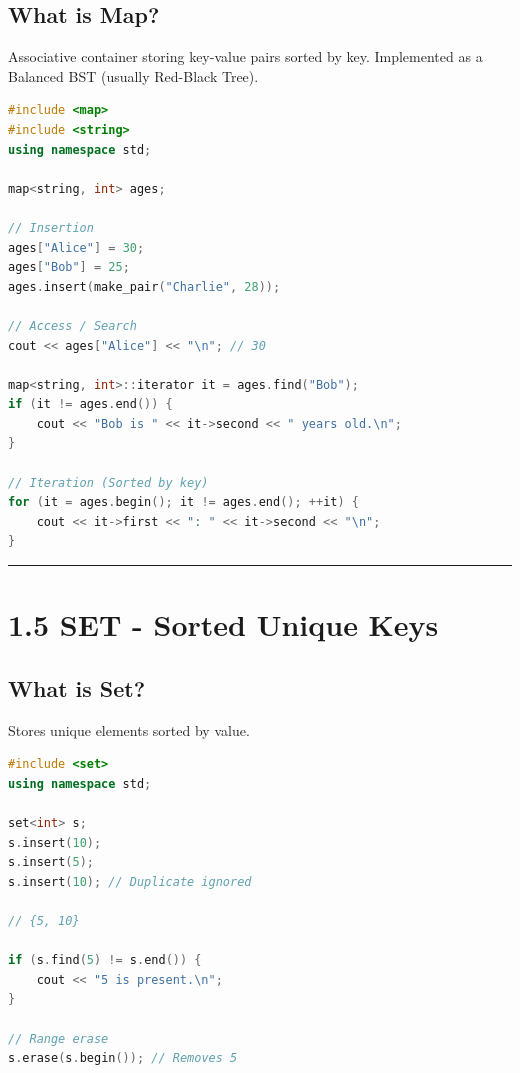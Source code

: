 \hypertarget{what-is-map}{%
\subsection{What is Map?}\label{what-is-map}}

Associative container storing key-value pairs sorted by key. Implemented
as a Balanced BST (usually Red-Black Tree).

\begin{lstlisting}[language={C++}]
#include <map>
#include <string>
using namespace std;

map<string, int> ages;

// Insertion
ages["Alice"] = 30;
ages["Bob"] = 25;
ages.insert(make_pair("Charlie", 28));

// Access / Search
cout << ages["Alice"] << "\n"; // 30

map<string, int>::iterator it = ages.find("Bob");
if (it != ages.end()) {
    cout << "Bob is " << it->second << " years old.\n";
}

// Iteration (Sorted by key)
for (it = ages.begin(); it != ages.end(); ++it) {
    cout << it->first << ": " << it->second << "\n";
}
\end{lstlisting}

\begin{center}\rule{0.5\linewidth}{0.5pt}\end{center}

\hypertarget{set---sorted-unique-keys}{%
\section{1.5 SET - Sorted Unique Keys}\label{set---sorted-unique-keys}}

\hypertarget{what-is-set}{%
\subsection{What is Set?}\label{what-is-set}}

Stores unique elements sorted by value.

\begin{lstlisting}[language={C++}]
#include <set>
using namespace std;

set<int> s;
s.insert(10);
s.insert(5);
s.insert(10); // Duplicate ignored

// {5, 10}

if (s.find(5) != s.end()) {
    cout << "5 is present.\n";
}

// Range erase
s.erase(s.begin()); // Removes 5
\end{lstlisting}

